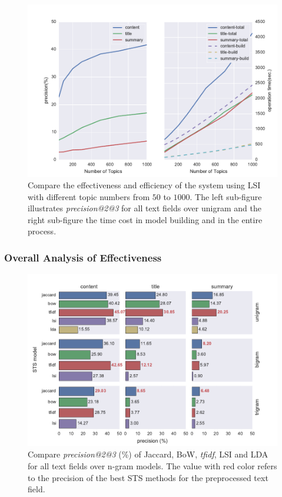 \begin{figure}[!htb]
    \centering
    \includegraphics[width=\textwidth]{fig/precision_topics}
    \caption[Compare the effectiveness and efficiency of the system using LSI with different topic numbers from $50$ to $1000$.]{Compare the effectiveness and efficiency of the system using LSI with different topic numbers from $50$ to $1000$. The left sub-figure illustrates  \textit{precision@2@3} for all text fields over unigram and the right sub-figure the time cost in model building and in the entire process. }
    \label{fig:precision_topics}
\end{figure}

\subsubsection{Overall Analysis of Effectiveness}

\begin{figure}[!htb]
    \centering
    \includegraphics[width=\textwidth]{fig/precision_2_3}
    \caption[Compare \textit{precision@2@3} (\%) of Jaccard, BoW, \textit{tfidf}, LSI and LDA for all text fields over n-gram models.]{Compare \textit{precision@2@3} (\%) of Jaccard, BoW, \textit{tfidf}, LSI and LDA for all text fields over n-gram models. The value with red color refers to the precision of the best STS methods for the preprocessed text field. }
    \label{fig:precision_2_3}
\end{figure}

